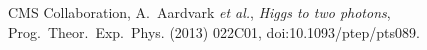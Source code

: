 \begin{thebibliography}{99}


CMS Collaboration, A.~Aardvark {\it et al.},
{\sl Higgs to two photons}, Prog.~Theor.~Exp.~Phys. (2013) 022C01,
doi:10.1093/ptep/pts089.

\end{thebibliography}
